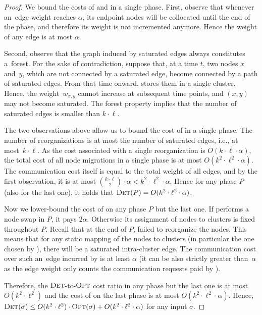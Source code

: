 \begin{proof}
We bound the costs of \DET and \OPT in a single phase. First, observe that
whenever an~edge weight reaches $\alpha$, its endpoint nodes will be collocated 
until the end of the phase, and therefore its weight is not
incremented anymore. Hence the weight of any edge is at most $\alpha$.

Second, observe that the graph induced by saturated edges always constitutes 
a~forest. For the sake of contradiction, suppose that, at a time $t$,
two nodes $x$ and~$y$, which are not
connected by a saturated edge, become connected by a path of saturated edges.
From that time onward, \DET stores them in a single cluster. Hence, the
weight~$w_{x,y}$ cannot increase at subsequent time points, and $(x,y)$ may
not become saturated. The forest property implies that the number of saturated
edges is smaller than $k \cdot \ell$.

The two observations above allow us to bound the cost of \DET in a single
phase. The number of reorganizations is at most the number of saturated edges,
i.e., at most~$k \cdot \ell$. As the cost associated with a single
reorganization is $O(k \cdot \ell \cdot \alpha)$, the total cost of all node
migrations in a single phase is at most $O(k^2 \cdot \ell^2 \cdot \alpha)$.
The communication cost itself is equal to the total weight of all edges, and
by the first observation, it is at most $\binom{k \cdot \ell}{2}
\cdot \alpha < k^2 \cdot \ell^2 \cdot \alpha$. Hence for any phase $P$ (also
for the last one), it holds that $\textsc{Det}(P) = O(k^2 \cdot \ell^2 \cdot \alpha)$.

Now we lower-bound the cost of \OPT on any phase $P$ but the last one. If \OPT
performs a node swap in $P$, it pays $2 \alpha$. Otherwise its assignment of
nodes to clusters is fixed throughout $P$. Recall that at the end of $P$, \DET
failed to reorganize the nodes. This means that for any static mapping of the
nodes to clusters (in particular the one chosen by \OPT), there will be a
saturated intra-cluster edge. The communication cost over such an~edge incurred
by \OPT is at least $\alpha$ (it can be also strictly greater than~$\alpha$ as
the edge weight only counts the communication requests paid by \DET).

Therefore, the $\textsc{Det}$-to-$\textsc{Opt}$ cost ratio in any phase but the last one is at
most $O(k^2 \cdot \ell^2)$ and the cost of \DET on the last phase is at
most $O(k^2 \cdot \ell^2 \cdot \alpha)$. Hence,
$\textsc{Det}(\sigma) \leq O(k^2 \cdot \ell^2) \cdot \textsc{Opt}(\sigma) + O(k^2 \cdot
\ell^2 \cdot \alpha)$ for any input $\sigma$.
\end{proof}


